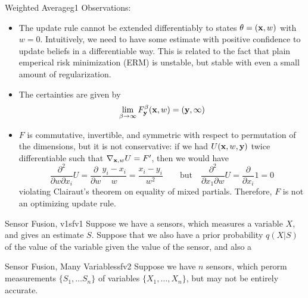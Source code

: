 \documentclass{article}
\begin{document}
\begin{examplex}{Weighted Average}{g1}
    Observations:
    \begin{itemize}
        \item The update rule cannot be extended differentiably to states $\theta = (\mathbf{x}, w)$ with $w = 0$.
            Intuitively, we need to have some estimate with positive confidence to update beliefs in a differentiable way.
            This is related to the fact that plain emperical risk minimization (ERM) is unstable, but stable with even a small amount of regularization.
        \item The certainties are given by
        \[
            \lim_{\beta \to \infty} F^{\beta}_{\mathbf{y}}(\mathbf{x}, w) = (\mathbf{y}, \infty)
        \]
        \item $F$ is commutative, invertible, and symmetric with respect to permutation of the dimensions, but it is not conservative: if we had $U(\mathbf{x}, w, \mathbf{y})$ twice differentiable such that $\nabla_{\mathbf{x}, w} U = F'$, then we would have
        \[\frac{\partial^2}{\partial w \partial x_i} U =
            \frac\partial{\partial w} \frac{y_i - x_i}{w} = \frac{x_i - y_i}{w^2}
            \qquad
            \text{but}
            \quad
            \frac{\partial^2}{\partial x_1 \partial w} U
            = \frac\partial{\partial x_i} 1 = 0
        \]
        violating Clairaut's theorem on equality of mixed partials.
        Therefore, $F$ is not an optimizing update rule.
    \end{itemize}
\end{examplex}
\begin{examplex}{Sensor Fusion, v1}{sfv1}
    Suppose we have a sensors, which measures a variable $X$, and gives an estimate $S$.
    Suppose that we also have a prior probability $q(X|S)$ of the value of the variable given the value of the sensor, and also a
\end{examplex}
\begin{examplex}{Sensor Fusion, Many Variables}{sfv2}
    Suppose we have $n$ sensors, which perorm measurements $\{S_1, \ldots S_n\}$ of variables $\{X_1, \ldots, X_n\}$, but may not be entirely accurate.
\end{examplex}
\end{document}
